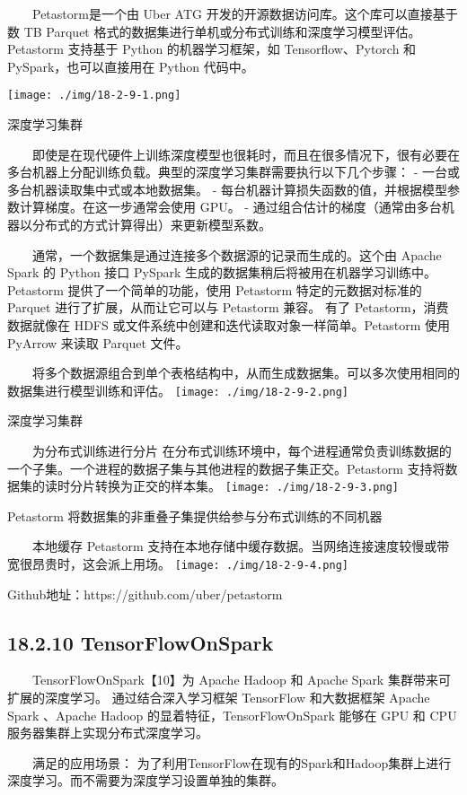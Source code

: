   Petastorm是一个由 Uber ATG 开发的开源数据访问库。这个库可以直接基于数
TB Parquet 格式的数据集进行单机或分布式训练和深度学习模型评估。Petastorm
支持基于 Python 的机器学习框架，如 Tensorflow、Pytorch 和
PySpark，也可以直接用在 Python 代码中。

\texttt{[image: ./img/18-2-9-1.png]}

深度学习集群

  即使是在现代硬件上训练深度模型也很耗时，而且在很多情况下，很有必要在多台机器上分配训练负载。典型的深度学习集群需要执行以下几个步骤：
- 一台或多台机器读取集中式或本地数据集。 -
每台机器计算损失函数的值，并根据模型参数计算梯度。在这一步通常会使用
GPU。 -
通过组合估计的梯度（通常由多台机器以分布式的方式计算得出）来更新模型系数。

  通常，一个数据集是通过连接多个数据源的记录而生成的。这个由 Apache
Spark 的 Python 接口 PySpark
生成的数据集稍后将被用在机器学习训练中。Petastorm
提供了一个简单的功能，使用 Petastorm 特定的元数据对标准的 Parquet
进行了扩展，从而让它可以与 Petastorm 兼容。 有了
Petastorm，消费数据就像在 HDFS
或文件系统中创建和迭代读取对象一样简单。Petastorm 使用 PyArrow 来读取
Parquet 文件。

  将多个数据源组合到单个表格结构中，从而生成数据集。可以多次使用相同的数据集进行模型训练和评估。
\texttt{[image: ./img/18-2-9-2.png]}

深度学习集群

  为分布式训练进行分片
在分布式训练环境中，每个进程通常负责训练数据的一个子集。一个进程的数据子集与其他进程的数据子集正交。Petastorm
支持将数据集的读时分片转换为正交的样本集。
\texttt{[image: ./img/18-2-9-3.png]}

Petastorm 将数据集的非重叠子集提供给参与分布式训练的不同机器

  本地缓存 Petastorm
支持在本地存储中缓存数据。当网络连接速度较慢或带宽很昂贵时，这会派上用场。
\texttt{[image: ./img/18-2-9-4.png]}

Github地址：https://github.com/uber/petastorm

\subsection{18.2.10 TensorFlowOnSpark}\label{tensorflowonspark}

  TensorFlowOnSpark【10】为 Apache Hadoop 和 Apache Spark
集群带来可扩展的深度学习。 通过结合深入学习框架 TensorFlow 和大数据框架
Apache Spark 、Apache Hadoop 的显着特征，TensorFlowOnSpark 能够在 GPU 和
CPU 服务器集群上实现分布式深度学习。

  满足的应用场景：
为了利用TensorFlow在现有的Spark和Hadoop集群上进行深度学习。而不需要为深度学习设置单独的集群。

